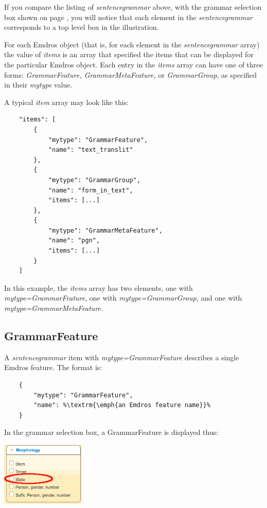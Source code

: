 \documentclass[11pt,oneside,a4paper]{memoir}
\begin{document}
If you compare the listing of \emph{sentencegrammar} above, with the grammar selection box shown on
page \pageref{grammarselect}, you will notice that each element in the \emph{sentencegrammar}
corresponds to a top level box in the illustration.

For each Emdros object (that is, for each element in the \emph{sentencegrammar} array) the value of
\emph{items} is an array that specified the items that can be displayed for the particular Emdros
object. Each entry in the \emph{items} array can have one of three forms: \emph{GrammarFeature,
  GrammarMetaFeature,} or \emph{GrammarGroup}, as specified in their \emph{mytype} value.

A typical \emph{item} array may look like this:

\begin{lstlisting}
    "items": [
        {
            "mytype": "GrammarFeature",
            "name": "text_translit"
        },
        {
            "mytype": "GrammarGroup",
            "name": "form_in_text",
            "items": [...]
        },
        {
            "mytype": "GrammarMetaFeature",
            "name": "pgn",
            "items": [...]
        }
    ]
\end{lstlisting}

In this example, the \emph{items} array has two elements, one with \emph{mytype=GrammarFeature},
one with \emph{mytype=GrammarGroup}, and one with \emph{mytype=GrammarMetaFeature.}

\subsection{GrammarFeature}\label{sec-grammarfeature}

A \emph{sentencegrammar} item with \emph{mytype=GrammarFeature} describes a single Emdros
feature. The format is:

\begin{lstlisting}
    {
        "mytype": "GrammarFeature",
        "name": %\textrm{\emph{an Emdros feature name}}%
    }
\end{lstlisting}

\Needspace*{5cm}%
In the grammar selection box, a GrammarFeature is displayed thus:

\begin{center}
  \includegraphics[width=0.3\textwidth]{state1.png}
\end{center}
\end{document}
